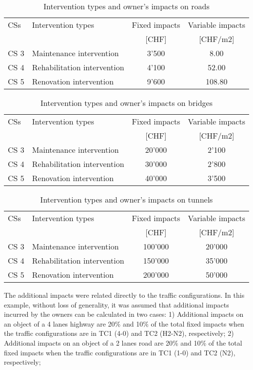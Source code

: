 \documentclass[a4paper,3p,times,authoryear]{elsarticle}
\begin{document}
\begin{table}[H]
\centering
\caption{Intervention types and owner's impacts on roads} \label{roadimpacts}
\begin{tabular}{|l|p{5cm}|c|c|}
\hline
CSs & Intervention types & Fixed impacts& Variable impacts\\ 
 &  & [CHF] & [CHF/m2] \\ 
\hline
CS 3 & Maintenance intervention & 3'500 & 8.00 \\ 
\hline
CS 4 & Rehabilitation intervention & 4'100 & 52.00 \\ 
\hline
CS 5 & Renovation intervention & 9'600 & 108.80 \\ 
\hline
\end{tabular}
\end{table}


\begin{table}[H]
\centering
\caption{Intervention types and owner's impacts on bridges} \label{bridgeimpacts}
\begin{tabular}{|l|p{5cm}|c|c|}
\hline
CSs & Intervention types & Fixed impacts& Variable impacts\\ 
 &  & [CHF] & [CHF/m2] \\ 
\hline
CS 3 & Maintenance intervention & 20'000 & 2'100 \\ 
\hline
CS 4 & Rehabilitation intervention & 30'000 & 2'800 \\ 
\hline
CS 5 & Renovation intervention & 40'000 & 3'500 \\ 
\hline
\end{tabular}
\end{table}

\begin{table}[H]
\centering
\caption{Intervention types and owner's impacts on tunnels} \label{tunnelimpacts}
\begin{tabular}{|l|p{5cm}|c|c|}
\hline
CSs & Intervention types & Fixed impacts& Variable impacts\\ 
 &  & [CHF] & [CHF/m2] \\ 
\hline
CS 3 & Maintenance intervention & 100'000 & 20'000 \\ 
\hline
CS 4 & Rehabilitation intervention & 150'000 & 35'000 \\ 
\hline
CS 5 & Renovation intervention & 200'000 & 50'000 \\ 
\hline
\end{tabular}
\end{table}

The additional impacts were related directly to the traffic configurations. In this example, without loss of generality, it was assumed that additional impacts incurred by the owners can be calculated in two cases: 1) Additional impacts on an object of a 4 lanes highway are 20\% and 10\% of the total fixed impacts when the traffic configurations are in TC1 (4-0) and TC2 (H2-N2), respectively; 2) Additional impacts on an object of a 2 lanes road are 20\% and 10\% of the total fixed impacts when the traffic configurations are in TC1 (1-0) and TC2 (N2), respectively;
%
%
\end{document}
